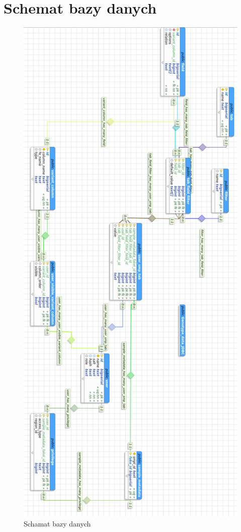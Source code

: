 \documentclass[a4paper,12pt,twoside]{article}
\begin{document}
\newpage
{}
\section{Schemat bazy danych}
\begin{figure}[h!]
  \includegraphics[width=\textwidth, height=0.9\textheight]{obrazy/aplikacja/database.png}
  \caption{Schamat bazy danych}
  \label{fig:bazadanych}
\end{figure}
\end{document}
